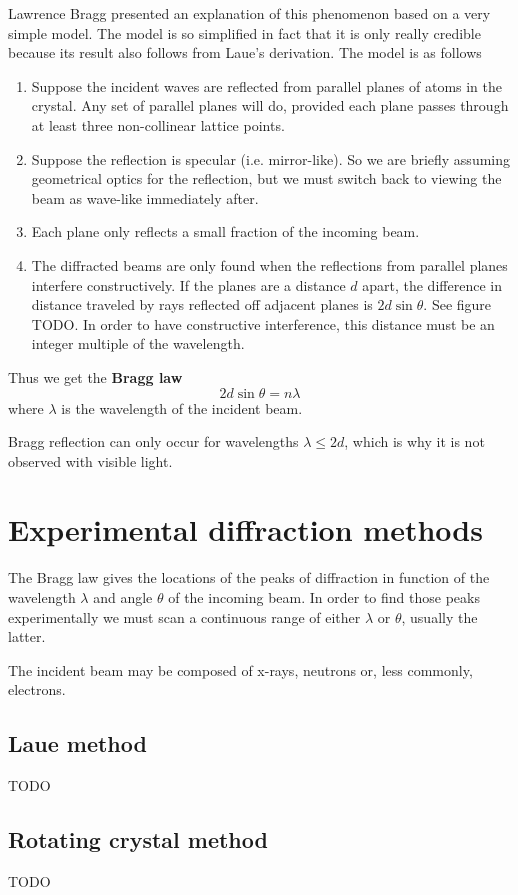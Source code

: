 Lawrence Bragg presented an explanation of this phenomenon based on a very simple model. The model is so simplified in fact that it is only really credible because its result also follows from Laue's derivation. The model is as follows
\begin{enumerate}
\item Suppose the incident waves are reflected from parallel planes of atoms in the crystal. Any set of parallel planes will do, provided each plane passes through at least three non-collinear lattice points.
\item Suppose the reflection is specular (i.e. mirror-like). So we are briefly assuming geometrical optics for the reflection, but we must switch back to viewing the beam as wave-like immediately after.
\item Each plane only reflects a small fraction of the incoming beam.
\item The diffracted beams are only found when the reflections from parallel planes interfere constructively. If the planes are a distance $d$ apart, the difference in distance traveled by rays reflected off adjacent planes is $2d \sin \theta$. See figure TODO. In order to have constructive interference, this distance must be an integer multiple of the wavelength.
\end{enumerate}
Thus we get the \textbf{Bragg law}
\[ \boxed{2d\sin\theta = n\lambda} \]
where $\lambda$ is the wavelength of the incident beam.

Bragg reflection can only occur for wavelengths $\lambda \leq 2d$, which is why it is not observed with visible light.

\section{Experimental diffraction methods}
The Bragg law gives the locations of the peaks of diffraction in function of the wavelength $\lambda$ and angle $\theta$ of the incoming beam. In order to find those peaks experimentally we must scan a continuous range of either $\lambda$ or $\theta$, usually the latter.

The incident beam may be composed of x-rays, neutrons or, less commonly, electrons.
\subsection{Laue method}
TODO
\subsection{Rotating crystal method}
TODO
